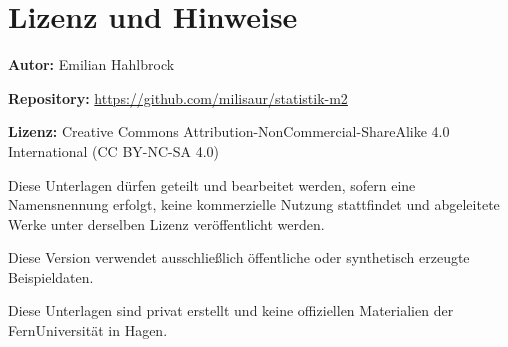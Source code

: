 \clearpage
\thispagestyle{empty}

\section*{Lizenz und Hinweise}

\textbf{Autor:} Emilian Hahlbrock

\medskip

\textbf{Repository:} \url{https://github.com/milisaur/statistik-m2}

\medskip

\textbf{Lizenz:} Creative Commons Attribution-NonCommercial-ShareAlike 4.0 International (CC BY-NC-SA 4.0)

\medskip

Diese Unterlagen dürfen geteilt und bearbeitet werden, sofern eine Namensnennung erfolgt, keine kommerzielle Nutzung stattfindet und abgeleitete Werke unter derselben Lizenz veröffentlicht werden.

\medskip

Diese Version verwendet ausschließlich öffentliche oder synthetisch erzeugte Beispieldaten.

\medskip

Diese Unterlagen sind privat erstellt und keine offiziellen Materialien der FernUniversität in Hagen.

\clearpage
